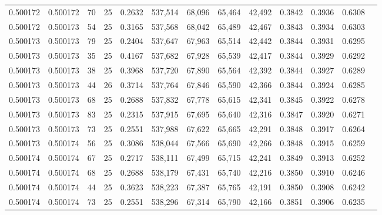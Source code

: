 \begin{tabular}{rrrrrrrrrrrrr}
0.500172 & 0.500172 &    70 &  25 &                                     0.2632 & 537,514 &  68,096 &  65,464 &  42,492 & 0.3842 & 0.3936 & 0.6308 \\
0.500172 & 0.500173 &    54 &  25 &                                     0.3165 & 537,568 &  68,042 &  65,489 &  42,467 & 0.3843 & 0.3934 & 0.6303 \\
0.500173 & 0.500173 &    79 &  25 &                                     0.2404 & 537,647 &  67,963 &  65,514 &  42,442 & 0.3844 & 0.3931 & 0.6295 \\
0.500173 & 0.500173 &    35 &  25 &                                     0.4167 & 537,682 &  67,928 &  65,539 &  42,417 & 0.3844 & 0.3929 & 0.6292 \\
0.500173 & 0.500173 &    38 &  25 &                                     0.3968 & 537,720 &  67,890 &  65,564 &  42,392 & 0.3844 & 0.3927 & 0.6289 \\
0.500173 & 0.500173 &    44 &  26 &                                     0.3714 & 537,764 &  67,846 &  65,590 &  42,366 & 0.3844 & 0.3924 & 0.6285 \\
0.500173 & 0.500173 &    68 &  25 &                                     0.2688 & 537,832 &  67,778 &  65,615 &  42,341 & 0.3845 & 0.3922 & 0.6278 \\
0.500173 & 0.500173 &    83 &  25 &                                     0.2315 & 537,915 &  67,695 &  65,640 &  42,316 & 0.3847 & 0.3920 & 0.6271 \\
0.500173 & 0.500173 &    73 &  25 &                                     0.2551 & 537,988 &  67,622 &  65,665 &  42,291 & 0.3848 & 0.3917 & 0.6264 \\
0.500173 & 0.500174 &    56 &  25 &                                     0.3086 & 538,044 &  67,566 &  65,690 &  42,266 & 0.3848 & 0.3915 & 0.6259 \\
0.500174 & 0.500174 &    67 &  25 &                                     0.2717 & 538,111 &  67,499 &  65,715 &  42,241 & 0.3849 & 0.3913 & 0.6252 \\
0.500174 & 0.500174 &    68 &  25 &                                     0.2688 & 538,179 &  67,431 &  65,740 &  42,216 & 0.3850 & 0.3910 & 0.6246 \\
0.500174 & 0.500174 &    44 &  25 &                                     0.3623 & 538,223 &  67,387 &  65,765 &  42,191 & 0.3850 & 0.3908 & 0.6242 \\
0.500174 & 0.500174 &    73 &  25 &                                     0.2551 & 538,296 &  67,314 &  65,790 &  42,166 & 0.3851 & 0.3906 & 0.6235 \\

\end{tabular}
